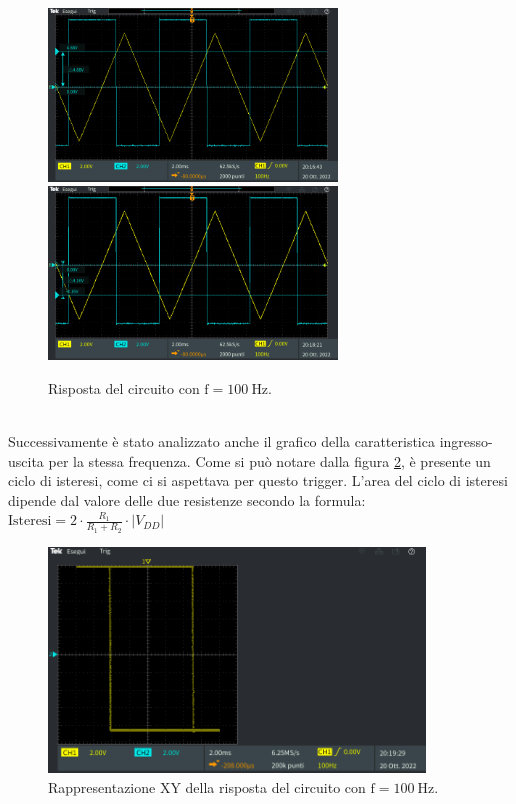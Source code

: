 \documentclass{report}
\begin{document}
\begin{figure}[h!]
	\centering
	\includegraphics[height=4.6cm]{immagini/TEK00017}
	\includegraphics[height=4.6cm]{immagini/TEK00018}
	\caption{Risposta del circuito con $\mathrm{f= \SI{100}{\hertz}}$.}
	\label{figura:uscita21}
\end{figure}
\\\indent Successivamente è stato analizzato anche il grafico della caratteristica ingresso-uscita per la stessa frequenza. Come si può notare dalla figura \ref{figura:uscita22}, è presente un ciclo di isteresi, come ci si aspettava per questo trigger. L'area del ciclo di isteresi dipende dal valore delle due resistenze secondo la formula:
\\[2pt]\indent$\displaystyle{\mathrm{Isteresi}=2\cdot\frac{R_1}{R_1+R_2}\cdot |V_ {DD}|}$
\begin{figure}[h!]
	\centering
	\includegraphics[height=6cm]{immagini/TEK00019}
	\caption{Rappresentazione XY della risposta del circuito con $\mathrm{f= \SI{100}{\hertz}}$.}
	\label{figura:uscita22}
\end{figure}
\end{document}
